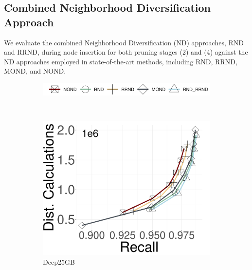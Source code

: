 \subsection{Combined Neighborhood Diversification Approach}

We evaluate the combined Neighborhood Diversification (ND) approaches, RND and RRND, during node insertion for both pruning stages (2) and (4) against the ND approaches employed in state-of-the-art methods, including RND, RRND, MOND, and NOND.

\begin{figure}[ht]
	\captionsetup{justification=centering}
	\centering	
		\begin{subfigure}{\columnwidth}
			\centering
			\captionsetup{justification=centering}	
			\includegraphics[width=0.6\columnwidth]{../img/oigas/RND_RRND/legend.png}
		\end{subfigure}\\
		\begin{subfigure}{0.28\columnwidth}
			\centering
			\captionsetup{justification=centering}	
			\includegraphics[width=\textwidth]{../img/oigas/RND_RRND/DC_DEEP25GB.pdf}
		\caption{{Deep25GB}}
		\label{fig:ND:deep25GB}	
		\end{subfigure}	
  \hspace{0.4cm}
		\begin{subfigure}{0.28\columnwidth}
			\centering
			\captionsetup{justification=centering}	

\end{subfigure}
\end{figure}
